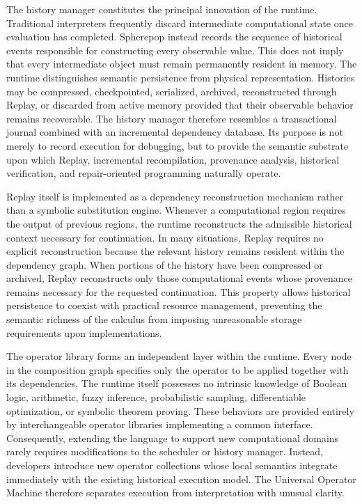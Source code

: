 \documentclass[12pt,oneside]{article}
\theoremstyle{definition}
\theoremstyle{remark}
\begin{document}
The history manager constitutes the principal innovation of the runtime.
Traditional interpreters frequently discard intermediate computational state
once evaluation has completed. Spherepop instead records the sequence of
historical events responsible for constructing every observable value. This
does not imply that every intermediate object must remain permanently resident
in memory. The runtime distinguishes semantic persistence from physical
representation. Histories may be compressed, checkpointed, serialized,
archived, reconstructed through Replay, or discarded from active memory
provided that their observable behavior remains recoverable. The history
manager therefore resembles a transactional journal combined with an
incremental dependency database. Its purpose is not merely to record execution
for debugging, but to provide the semantic substrate upon which Replay,
incremental recompilation, provenance analysis, historical verification, and
repair-oriented programming naturally operate.

Replay itself is implemented as a dependency reconstruction mechanism rather
than a symbolic substitution engine. Whenever a computational region requires
the output of previous regions, the runtime reconstructs the admissible
historical context necessary for continuation. In many situations, Replay
requires no explicit reconstruction because the relevant history remains
resident within the dependency graph. When portions of the history have been
compressed or archived, Replay reconstructs only those computational events
whose provenance remains necessary for the requested continuation. This
property allows historical persistence to coexist with practical resource
management, preventing the semantic richness of the calculus from imposing
unreasonable storage requirements upon implementations.

The operator library forms an independent layer within the runtime. Every node
in the composition graph specifies only the operator to be applied together
with its dependencies. The runtime itself possesses no intrinsic knowledge of
Boolean logic, arithmetic, fuzzy inference, probabilistic sampling,
differentiable optimization, or symbolic theorem proving. These behaviors are
provided entirely by interchangeable operator libraries implementing a common
interface. Consequently, extending the language to support new computational
domains rarely requires modifications to the scheduler or history manager.
Instead, developers introduce new operator collections whose local semantics
integrate immediately with the existing historical execution model. The
Universal Operator Machine therefore separates execution from interpretation
with unusual clarity.
\end{document}
